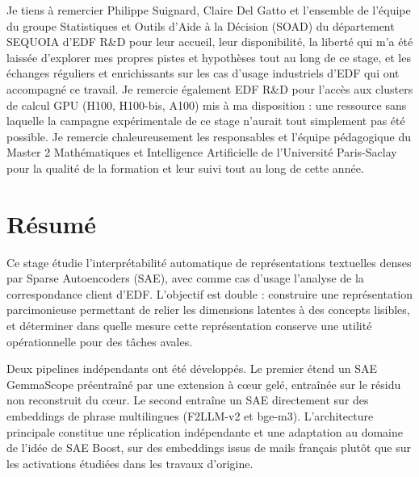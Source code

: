 \documentclass[11pt]{article}
\begin{document}
Je tiens à remercier Philippe Suignard, Claire Del Gatto et l'ensemble de
l'équipe du groupe Statistiques et Outils d'Aide à la Décision (SOAD) du
département SEQUOIA d'EDF R\&D pour leur accueil, leur disponibilité, la
liberté qui m'a été laissée d'explorer mes propres pistes et hypothèses tout
au long de ce stage, et les échanges réguliers et enrichissants sur les cas
d'usage industriels d'EDF qui ont accompagné ce travail. Je remercie
également EDF R\&D pour l'accès aux clusters de calcul GPU (H100, H100-bis,
A100) mis à ma disposition : une ressource sans laquelle la campagne
expérimentale de ce stage n'aurait tout simplement pas été possible. Je remercie chaleureusement les responsables et l'équipe pédagogique du Master 2 Mathématiques et Intelligence Artificielle de l'Université Paris-Saclay pour la qualité de la formation et leur suivi tout au long de cette année.

\newpage
\section*{Résumé}

Ce stage étudie l'interprétabilité automatique de représentations textuelles denses par
Sparse Autoencoders (SAE), avec comme cas d'usage l'analyse de la correspondance
client d'EDF. L'objectif est double : construire une représentation parcimonieuse
permettant de relier les dimensions latentes à des concepts lisibles, et déterminer
dans quelle mesure cette représentation conserve une utilité opérationnelle pour des
tâches avales.

Deux pipelines indépendants ont été développés. Le premier étend un SAE GemmaScope
préentraîné par une extension à cœur gelé, entraînée sur le résidu non reconstruit du
cœur. Le second entraîne un SAE directement sur des embeddings de phrase multilingues
(F2LLM-v2 et bge-m3). L'architecture principale constitue une réplication indépendante
et une adaptation au domaine de l'idée de SAE Boost, sur des embeddings issus de mails
français plutôt que sur les activations étudiées dans les travaux d'origine.
\end{document}
